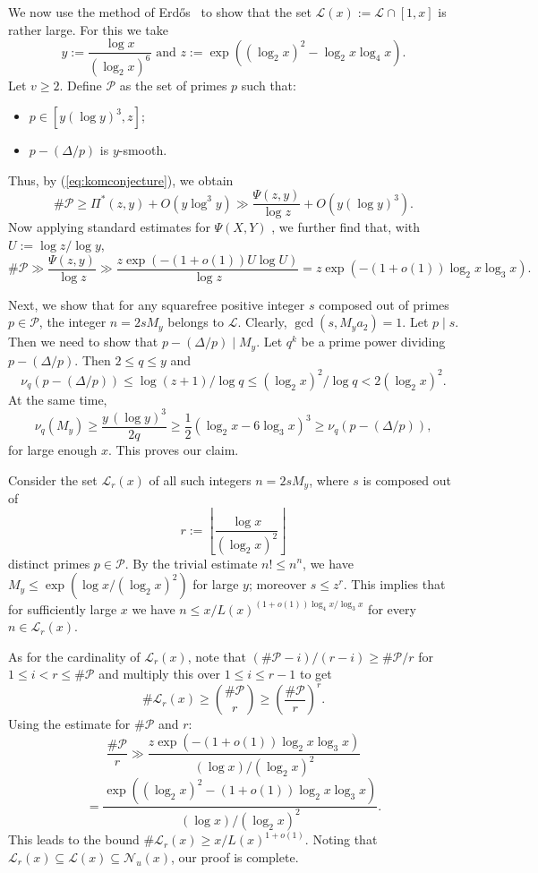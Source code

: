 \documentclass[12pt,a4paper,oneside]{amsart}
\begin{document}
\medskip

We now use the method of Erdős~\cite{Er35} to show that the set 
$\mathcal{L}(x):=\mathcal{L}\cap[1,x]$ is rather large. For this we take 
$$
y := \frac{\log x}{(\log_{2} x)^{6}} \text{ and } z :=\exp((\log_{2}x)^{2}-\log_{2}x\log_{4}x).
$$
Let $v\ge 2$.
Define $\mathcal{P}$ as the set of primes  $p$ such that:
\begin{itemize}
\item  $p \in [y(\log y)^3, z]$;
\item  $p-(\Delta/p)$ is $y$-smooth.
\end{itemize}

Thus, by (\ref{eq:komconjecture}), we obtain
$$
\#\mathcal{P} \geq \Pi^{*}(z,y) +O( y\log^3 y)  \gg \frac{\Psi(z,y)}{\log z}+O( y(\log y)^3).
$$
Now applying standard estimates for $\Psi(X,Y)$ \cite[Th. 2.1]{Po89}, we further find that, with $U:=\log z/\log y$,
\[\#\mathcal{P} \gg \frac{\Psi(z,y)}{\log z} \gg \frac{z\exp(-(1+o(1))U\log U)}{\log z}=z\exp(-(1+o(1))\log_{2}x\log_{3}x).\]


Next, we show that for any squarefree positive integer $s$ 
composed out of primes $p \in \mathcal{P}$, the integer $n = 2sM_y$ belongs to $ \mathcal{L}$. Clearly, $\gcd(s,M_ya_2)=1$. Let $p\mid s$. Then we need to show that $p-\left(\Delta/p\right)\mid M_y$. Let $q^{k}$ be a prime power dividing $p-\left(\Delta/p\right)$. Then $2 \le q\le y$ and \[\nu_{q}(p-\left(\Delta/p\right))\le \log (z+1)/\log q\le (\log_2 x)^
{2}/ \log q< 2(\log_{2} x)^2.\] At the same time, \[\nu_q(M_y)\ge \frac{y\,(\log y)^3}{2q}\ge \frac{1}{2} (\log_2 x-6\log_3 x)^3\ge \nu_{q}(p-\left(\Delta/p\right)) ,\] for large enough $x$. This proves our claim.

Consider the set $\mathcal{L}_r(x)$ of all such integers $n = 2sM_y$,
where  $s$ is composed out of 
$$
r :=\left\lfloor{\frac{\log x}{(\log_{2} x)^{2}}}\right\rfloor
$$ 
distinct primes $p\in \mathcal{P}$. 
By the trivial estimate $n!\le n^{n}$, we have 
$M_y \le \exp(\log x/(\log_{2} x)^2)$ for large $y$; moreover $s \le z^r$. This implies that  
for sufficiently large $x$ we have $n \le x/L(x)^{(1+o(1))\log_{4}x/\log_{3}x}$ for 
every $n \in \mathcal{L}_r(x)$. 

As for the cardinality of $\mathcal{L}_r(x)$, note that $(\#\mathcal{P}-i)/(r-i) \ge \#\mathcal{P}/r$ for $1 \leq i <r \leq \#\mathcal{P}$ and multiply this over $1 \leq i \leq r-1$ to get
$$\# \mathcal{L}_r(x) \ge \binom{\#\mathcal{P}}{r} \ge  \left(\frac{\#\mathcal{P}}{r}\right)^r. $$
Using the estimate for $\#\mathcal{P}$ and $r$:
\[ \frac{\#\mathcal{P}}{r} \gg \frac{z \exp(-(1+o(1))\log_2 x \log_3 x)}{(\log x)/(\log_2 x)^2} \]
\[ = \frac{\exp((\log_2 x)^2 - (1+o(1))\log_2 x \log_3 x)}{(\log x)/(\log_2 x)^2}. \]
This leads to the bound $\#\mathcal{L}_r(x)\ge  {x}/{L(x)^{1+o(1)}}$.
 Noting that $\mathcal{L}_r(x)\subseteq\mathcal{L}(x)\subseteq \mathcal{N}_u(x)$, our proof is complete.
\end{document}
